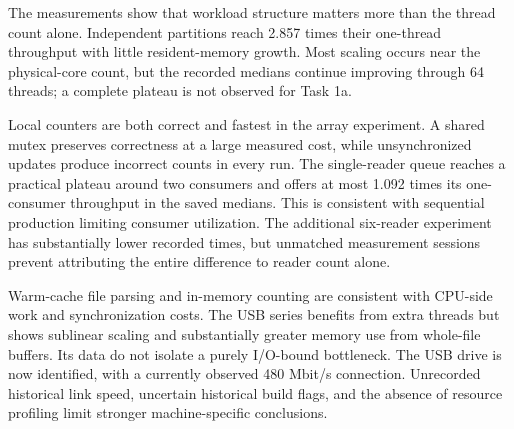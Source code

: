 \documentclass{../latex/utmreport}
\begin{document}
\utmconclusions
The measurements show that workload structure matters more than the thread
count alone. Independent partitions reach 2.857 times their one-thread
throughput with little resident-memory growth. Most scaling occurs near the
physical-core count, but the recorded medians continue improving through
64 threads; a complete plateau is not observed for Task 1a.

Local counters are both correct and fastest in the array experiment. A shared
mutex preserves correctness at a large measured cost, while unsynchronized
updates produce incorrect counts in every run. The single-reader queue reaches
a practical plateau around two consumers and offers at most 1.092 times its
one-consumer throughput in the saved medians. This is consistent with sequential
production limiting consumer utilization. The additional six-reader experiment
has substantially lower recorded times, but unmatched measurement sessions
prevent attributing the entire difference to reader count alone.

Warm-cache file parsing and in-memory counting are consistent with CPU-side
work and synchronization costs. The USB series benefits from extra threads
but shows sublinear scaling and substantially greater memory use from whole-file
buffers. Its data do not isolate a purely I/O-bound bottleneck. The USB drive
is now identified, with a currently observed 480 Mbit/s connection. Unrecorded
historical link speed, uncertain historical build flags, and the absence of
resource profiling limit stronger machine-specific conclusions.
\end{document}
